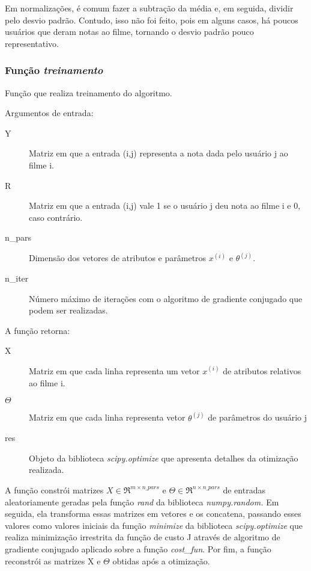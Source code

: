 \documentclass[12pt]{article}
\begin{document}
Em normalizações, é comum fazer a subtração da média e, em seguida, dividir pelo desvio padrão. Contudo, isso não foi feito, pois em alguns casos, há poucos usuários que deram notas ao filme, tornando o desvio padrão pouco representativo.

\subsubsection{Função \textit{treinamento}}
Função que realiza treinamento do algoritmo.

Argumentos de entrada:

\begin{description}
\item[Y] Matriz em que a entrada (i,j) representa a nota dada pelo usuário j ao filme i.
\item[R] Matriz em que a entrada (i,j) vale 1 se o usuário j deu nota ao filme i e 0, caso contrário.
\item[n\_pars] Dimensão dos vetores de atributos e parâmetros $x^{(i)}$ e $\theta^{(j)}$.
\item[n\_iter] Número máximo de iterações com o algoritmo de gradiente conjugado que podem ser realizadas. 
\end{description}

A função retorna:

\begin{description}
\item[X] Matriz  em que cada linha representa um vetor $x^{(i)}$ de atributos relativos ao filme i.
\item[$\Theta$] Matriz em que cada linha representa vetor $\theta^{(j)}$ de parâmetros do usuário j
\item[res] Objeto da biblioteca \textit{scipy.optimize} que apresenta detalhes da otimização realizada.
\end{description}

A função constrói matrizes $X \in \Re^{m \times n\_pars}$ e $\Theta \in \Re^{n \times n\_pars}$ de entradas aleatoriamente geradas pela função \textit{rand} da biblioteca \textit{numpy.random.} Em seguida, ela transforma essas matrizes em vetores e os concatena, passando esses valores como valores iniciais da função \textit{minimize} da biblioteca \textit{scipy.optimize} que realiza minimização irrestrita da função de custo J através de algoritmo de gradiente conjugado aplicado sobre a função \textit{cost\_fun}. Por fim, a função reconstrói as matrizes X e $\Theta$ obtidas após a otimização.
\end{document}
